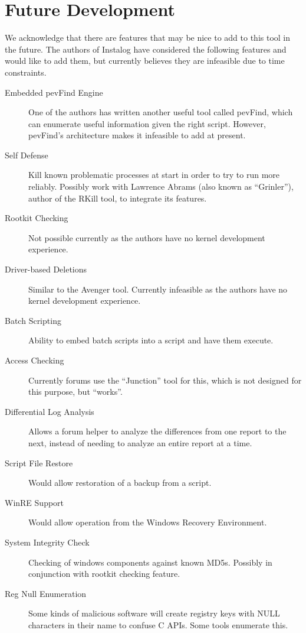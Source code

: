 \section{Future Development}
We acknowledge that there are features that may be nice to add to this tool in
the future. The authors of Instalog have considered the following features and
would like to add them, but currently believes they are infeasible due to time
constraints.
\begin{description}
\item[Embedded pevFind Engine] One of the authors has written another useful
tool called pevFind, which can enumerate useful information given the right
script. However, pevFind's architecture makes it infeasible to add at present.
\item[Self Defense] Kill known problematic processes at start in order to try to
run more reliably. Possibly work with Lawrence Abrams (also known as
``Grinler''), author of the RKill tool, to integrate its features.
\item[Rootkit Checking] Not possible currently as the authors have no kernel
development experience.
\item[Driver-based Deletions] Similar to the Avenger tool. Currently infeasible
as the authors have no kernel development experience.
\item[Batch Scripting] Ability to embed batch scripts into a script and have
them execute.
\item[Access Checking] Currently forums use the ``Junction'' tool for this,
which is not designed for this purpose, but ``works''.
\item[Differential Log Analysis] Allows a forum helper to analyze the
differences from one report to the next, instead of needing to analyze an entire
report at a time.
\item[Script File Restore] Would allow restoration of a backup from a script.
\item[WinRE Support] Would allow operation from the Windows Recovery
Environment.
\item[System Integrity Check] Checking of windows components against known
MD5s. Possibly in conjunction with rootkit checking feature.
\item[Reg Null Enumeration] Some kinds of malicious software will create
registry keys with NULL characters in their name to confuse C APIs. Some tools
enumerate this.
\end{description}
